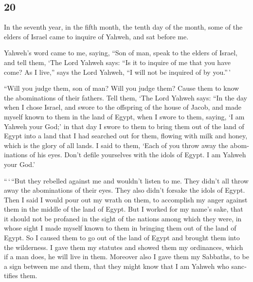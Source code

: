 \begin{paracol}{2}
\begin{otherlanguage}{english}
\hypertarget{section-39}{%
\section{20}\label{section-39}}

 In the seventh year, in the fifth month, the tenth day of
the month, some of the elders of Israel came to inquire of Yahweh, and
sat before me.

 Yahweh's word came to me, saying,  ``Son of
man, speak to the elders of Israel, and tell them, `The Lord Yahweh
says: ``Is it to inquire of me that you have come? As I live,'' says the
Lord Yahweh, ``I will not be inquired of by you.''\,'

 ``Will you judge them, son of man? Will you judge them?
Cause them to know the abominations of their fathers. 
Tell them, `The Lord Yahweh says: ``In the day when I chose Israel, and
swore to the offspring of the house of Jacob, and made myself known to
them in the land of Egypt, when I swore to them, saying, `I am Yahweh
your God;'  in that day I swore to them to bring them out
of the land of Egypt into a land that I had searched out for them,
flowing with milk and honey, which is the glory of all lands.
 I said to them, `Each of you throw away the abominations
of his eyes. Don't defile yourselves with the idols of Egypt. I am
Yahweh your God.'

 ``\,`\,``But they rebelled against me and wouldn't listen
to me. They didn't all throw away the abominations of their eyes. They
also didn't forsake the idols of Egypt. Then I said I would pour out my
wrath on them, to accomplish my anger against them in the middle of the
land of Egypt.  But I worked for my name's sake, that it
should not be profaned in the sight of the nations among which they
were, in whose sight I made myself known to them in bringing them out of
the land of Egypt.  So I caused them to go out of the
land of Egypt and brought them into the wilderness.  I
gave them my statutes and showed them my ordinances, which if a man
does, he will live in them.  Moreover also I gave them my
Sabbaths, to be a sign between me and them, that they might know that I
am Yahweh who sanctifies them.


\end{otherlanguage}
\end{paracol}
